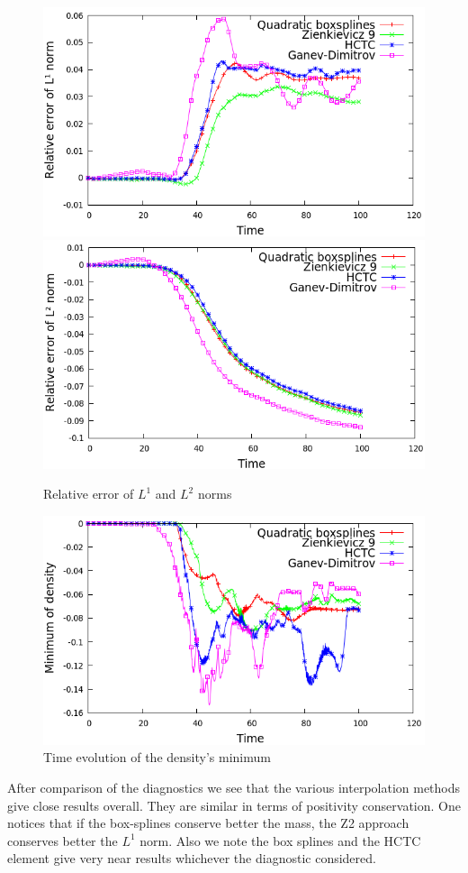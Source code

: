 \documentclass[proc]{edpsmath}
\begin{document}
\begin{figure}[h!]
	\includegraphics[scale=0.3]{figures/l1norm_cg.png}
	\includegraphics[scale=0.3]{figures/l2norm_cg.png}
	\caption{Relative error of $L^1$ and $L^2$ norms}
\end{figure}

\begin{figure}[h!]
	\includegraphics[scale=0.4]{figures/min_cg.png}
	\caption{Time evolution of the density's minimum}
\end{figure}
After comparison of the diagnostics we see that the various interpolation methods give close results overall. They are similar in terms of positivity conservation. One notices that if the box-splines conserve better the mass, the Z2 approach conserves better the $L^1$ norm. Also we note the box splines and the HCTC element give very near results whichever the diagnostic considered.  
\end{document}
